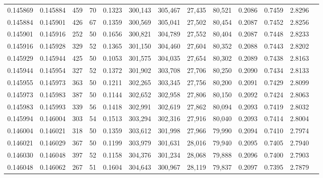\begin{tabular}{rrrrrrrrrrrrr}
0.145869 & 0.145884 &   459 &  70 &                                     0.1323 & 300,143 & 305,467 &  27,435 &  80,521 & 0.2086 & 0.7459 & 2.8296 \\
0.145884 & 0.145901 &   426 &  67 &                                     0.1359 & 300,569 & 305,041 &  27,502 &  80,454 & 0.2087 & 0.7452 & 2.8256 \\
0.145901 & 0.145916 &   252 &  50 &                                     0.1656 & 300,821 & 304,789 &  27,552 &  80,404 & 0.2087 & 0.7448 & 2.8233 \\
0.145916 & 0.145928 &   329 &  52 &                                     0.1365 & 301,150 & 304,460 &  27,604 &  80,352 & 0.2088 & 0.7443 & 2.8202 \\
0.145929 & 0.145944 &   425 &  50 &                                     0.1053 & 301,575 & 304,035 &  27,654 &  80,302 & 0.2089 & 0.7438 & 2.8163 \\
0.145944 & 0.145954 &   327 &  52 &                                     0.1372 & 301,902 & 303,708 &  27,706 &  80,250 & 0.2090 & 0.7434 & 2.8133 \\
0.145955 & 0.145973 &   363 &  50 &                                     0.1211 & 302,265 & 303,345 &  27,756 &  80,200 & 0.2091 & 0.7429 & 2.8099 \\
0.145973 & 0.145983 &   387 &  50 &                                     0.1144 & 302,652 & 302,958 &  27,806 &  80,150 & 0.2092 & 0.7424 & 2.8063 \\
0.145983 & 0.145993 &   339 &  56 &                                     0.1418 & 302,991 & 302,619 &  27,862 &  80,094 & 0.2093 & 0.7419 & 2.8032 \\
0.145994 & 0.146004 &   303 &  54 &                                     0.1513 & 303,294 & 302,316 &  27,916 &  80,040 & 0.2093 & 0.7414 & 2.8004 \\
0.146004 & 0.146021 &   318 &  50 &                                     0.1359 & 303,612 & 301,998 &  27,966 &  79,990 & 0.2094 & 0.7410 & 2.7974 \\
0.146021 & 0.146029 &   367 &  50 &                                     0.1199 & 303,979 & 301,631 &  28,016 &  79,940 & 0.2095 & 0.7405 & 2.7940 \\
0.146030 & 0.146048 &   397 &  52 &                                     0.1158 & 304,376 & 301,234 &  28,068 &  79,888 & 0.2096 & 0.7400 & 2.7903 \\
0.146048 & 0.146062 &   267 &  51 &                                     0.1604 & 304,643 & 300,967 &  28,119 &  79,837 & 0.2097 & 0.7395 & 2.7879 \\

\end{tabular}
